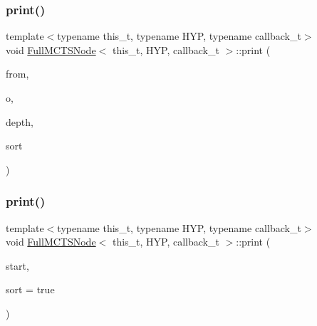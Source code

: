\subsubsection{\texorpdfstring{print()}{print()}\hspace{0.1cm}{\footnotesize\ttfamily [1/3]}}
{\footnotesize\ttfamily template$<$typename this\+\_\+t, typename H\+YP, typename callback\+\_\+t$>$ \\
void \hyperlink{class_full_m_c_t_s_node}{Full\+M\+C\+T\+S\+Node}$<$ this\+\_\+t, H\+YP, callback\+\_\+t $>$\+::print (\begin{DoxyParamCaption}\item[{H\+YP}]{from,  }\item[{std\+::ostream \&}]{o,  }\item[{const int}]{depth,  }\item[{const bool}]{sort }\end{DoxyParamCaption})\hspace{0.3cm}{\ttfamily [inline]}}

\mbox{\label{class_full_m_c_t_s_node_afa3770ff1034e32490c850b238fd6c2b}} 
\subsubsection{\texorpdfstring{print()}{print()}\hspace{0.1cm}{\footnotesize\ttfamily [2/3]}}
{\footnotesize\ttfamily template$<$typename this\+\_\+t, typename H\+YP, typename callback\+\_\+t$>$ \\
void \hyperlink{class_full_m_c_t_s_node}{Full\+M\+C\+T\+S\+Node}$<$ this\+\_\+t, H\+YP, callback\+\_\+t $>$\+::print (\begin{DoxyParamCaption}\item[{H\+YP \&}]{start,  }\item[{const bool}]{sort = {\ttfamily true} }\end{DoxyParamCaption})\hspace{0.3cm}{\ttfamily [inline]}}

\mbox{\label{class_full_m_c_t_s_node_ace1b31902dd5a8838b52be10a224f6c4}} 
